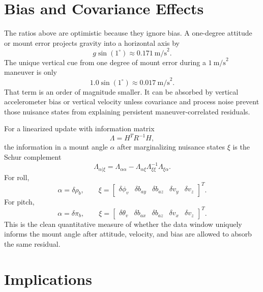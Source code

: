 \documentclass[11pt]{article}
\newcommand{\T}{^{T}}
\newcommand{\phiv}{\delta\phi_v}
\newcommand{\rhom}{\delta\rho_b}
\newcommand{\thetav}{\delta\theta_v}
\newcommand{\pim}{\delta\pi_b}
\begin{document}
\section{Bias and Covariance Effects}

The ratios above are optimistic because they ignore bias. A one-degree
attitude or mount error projects gravity into a horizontal axis by
\begin{equation}
  g\sin(1^\circ)\approx0.171\ \text{m/s}^2 .
\end{equation}
The unique vertical cue from one degree of mount error during a
\(1\ \text{m/s}^2\) maneuver is only
\begin{equation}
  1.0\sin(1^\circ)\approx0.017\ \text{m/s}^2 .
\end{equation}
That term is an order of magnitude smaller. It can be absorbed by vertical
accelerometer bias or vertical velocity unless covariance and process noise
prevent those nuisance states from explaining persistent maneuver-correlated
residuals.

For a linearized update with information matrix
\begin{equation}
  \Lambda=H\T R^{-1}H,
\end{equation}
the information in a mount angle \(\alpha\) after marginalizing nuisance states
\(\xi\) is the Schur complement
\begin{equation}
  \Lambda_{\alpha|\xi}
  =
  \Lambda_{\alpha\alpha}
  -
  \Lambda_{\alpha\xi}\Lambda_{\xi\xi}^{-1}\Lambda_{\xi\alpha}.
  \label{eq:schur}
\end{equation}
For roll,
\begin{equation}
  \alpha=\rhom,\qquad
  \xi=
  \begin{bmatrix}
  \phiv & \delta b_{ay} & \delta b_{az} & \delta v_y & \delta v_z
  \end{bmatrix}\T .
\end{equation}
For pitch,
\begin{equation}
  \alpha=\pim,\qquad
  \xi=
  \begin{bmatrix}
  \thetav & \delta b_{ax} & \delta b_{az} & \delta v_x & \delta v_z
  \end{bmatrix}\T .
\end{equation}
This is the clean quantitative measure of whether the data window uniquely
informs the mount angle after attitude, velocity, and bias are allowed to
absorb the same residual.

\section{Implications}
\end{document}
